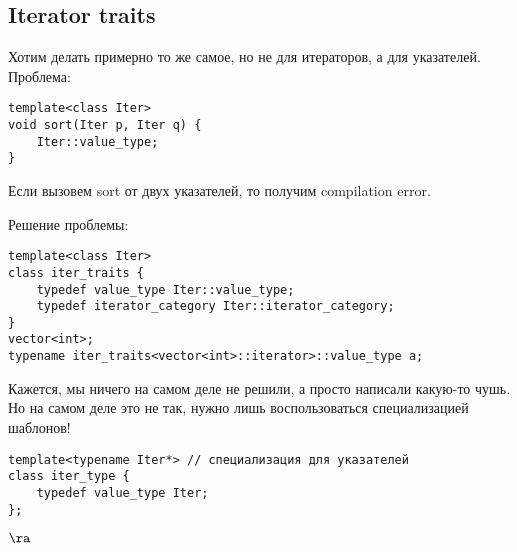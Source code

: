 \subsection{Iterator traits}
Хотим делать примерно то же самое, но не для итераторов, а для указателей.
Проблема:
\begin{verbatim}
template<class Iter>
void sort(Iter p, Iter q) {
    Iter::value_type;
}
\end{verbatim}
Если вызовем sort от двух указателей, то получим compilation error.

Решение проблемы:
\begin{verbatim}
template<class Iter>
class iter_traits {
    typedef value_type Iter::value_type;
    typedef iterator_category Iter::iterator_category;
}
vector<int>;
typename iter_traits<vector<int>::iterator>::value_type a;
\end{verbatim}

Кажется, мы ничего на самом деле не решили, а просто написали какую-то чушь. Но на самом деле это не так, нужно лишь воспользоваться специализацией шаблонов!

\begin{verbatim}
template<typename Iter*> // специализация для указателей
class iter_type {
    typedef value_type Iter;
};
\end{verbatim}
 $\ra$ 

